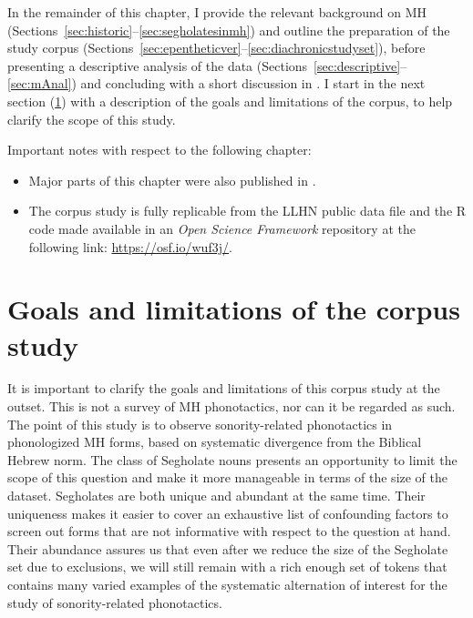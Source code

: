 In the remainder of this chapter, I provide the relevant background on MH (Sections~\ref{sec:historic}--\ref{sec:segholatesinmh}) and outline the preparation of the study corpus (Sections~\ref{sec:epentheticver}--\ref{sec:diachronicstudyset}), before presenting a descriptive analysis of the data (Sections~\ref{sec:descriptive}--\ref{sec:mAnal}) and concluding with a short discussion in . I start in the next section (\ref{sec:corpusLimits}) with a description of the goals and limitations of the corpus, to help clarify the scope of this study.

Important notes with respect to the following chapter:

\begin{itemize}
\item
  Major parts of this chapter were also published in \citet{albert2022sonority}.
\item
  The corpus study is fully replicable from the LLHN public data file and the R code made available in an \emph{Open Science Framework} repository at the following link: %
  \url{https://osf.io/wuf3j/}.
\end{itemize}

\section{Goals and limitations of the corpus study}\label{sec:corpusLimits}

It is important to clarify the goals and limitations of this corpus study at the outset. This is not a survey of MH phonotactics, nor can it be regarded as such. The point of this study is to observe sonority-related phonotactics in phonologized MH forms, based on systematic divergence from the Biblical Hebrew norm. The class of Segholate nouns presents an opportunity to limit the scope of this question and make it more
manageable in terms of the size of the dataset.
Segholates are both unique and abundant at the same time. Their uniqueness makes it easier to cover an exhaustive list of confounding factors to screen out forms that are not informative with respect to the question at hand. Their abundance assures us that even after we reduce the size of the Segholate set due to exclusions, we will still remain with a rich enough set of tokens that contains many varied examples of the systematic alternation of interest for the study of sonority-related phonotactics.

